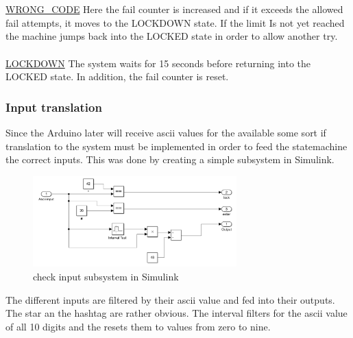 \\~\\
\underline{WRONG\_CODE} \newline
Here the fail counter is increased and if it exceeds the allowed fail attempts, it moves to the LOCKDOWN state. If the limit Is not yet reached the machine jumps back into the LOCKED state in order to allow another try. 
\\~\\
\underline{LOCKDOWN} \newline
The system waits for 15 seconds before returning into the LOCKED state. In addition, the fail counter is reset.

\subsubsection{Input translation}
Since the Arduino later will receive ascii values for the available some sort if translation to the system must be implemented in order to feed the statemachine the correct inputs. This was done by creating a simple subsystem in Simulink.
\begin{figure}[H]
		\centering
		\includegraphics[width=0.7\textwidth]{figures/check_input.png}
		\caption{check input subsystem in Simulink}
		\label{fig:scheme}
\end{figure}
The different inputs are filtered by their ascii value and fed into their outputs. The star an the hashtag are rather obvious. The interval filters for the ascii value of all 10 digits and the resets them to values from zero to nine. 

